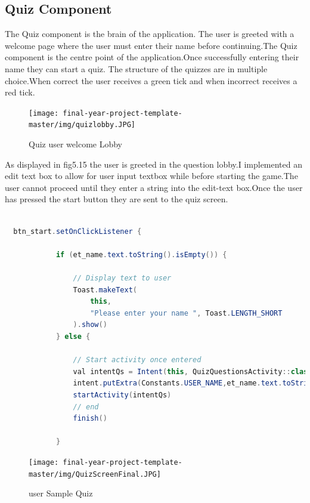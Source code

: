 \subsection{Quiz Component}
The Quiz component is the brain of the application. The user is greeted with a welcome page where the user must enter their name before continuing.The Quiz component is the centre point of the application.Once successfully entering their name they can start a quiz. The structure of the quizzes are in multiple choice.When correct the user receives a green tick and when incorrect receives a red tick.








 \begin{figure}[H]
  \centering
    \texttt{[image: final-year-project-template-master/img/quizlobby.JPG]}
     \caption{Quiz user welcome Lobby}
\end{figure}
As displayed in fig5.15 the user is greeted in the question lobby.I implemented an edit text box to allow for user input textbox while before starting the game.The user cannot proceed until they enter a string into the edit-text box.Once the user has pressed the start button they are sent to the quiz screen.


\begin{lstlisting}[language=Java, caption=Question Lobby CodeSnippets  ]

  btn_start.setOnClickListener {

            if (et_name.text.toString().isEmpty()) {

                // Display text to user
                Toast.makeText(
                    this,
                    "Please enter your name ", Toast.LENGTH_SHORT
                ).show()
            } else {

                // Start activity once entered
                val intentQs = Intent(this, QuizQuestionsActivity::class.java)
                intent.putExtra(Constants.USER_NAME,et_name.text.toString())
                startActivity(intentQs)
                // end
                finish()

            }

\end{lstlisting}


 \begin{figure}[H]
  \centering
    \texttt{[image: final-year-project-template-master/img/QuizScreenFinal.JPG]}
     \caption{user Sample Quiz}
\end{figure}

